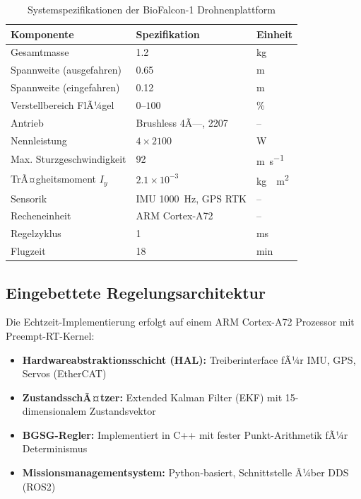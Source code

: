﻿\documentclass[12pt,a4paper]{article}
\theoremstyle{remark}
\begin{document}
	\begin{table}[H]
		\centering
		\caption{Systemspezifikationen der BioFalcon-1 Drohnenplattform}
		\label{tab:hardware}
		\begin{tabular}{lll}
			\toprule
			\textbf{Komponente} & \textbf{Spezifikation} & \textbf{Einheit} \\
			\midrule
			Gesamtmasse & 1.2 & \si{\kg} \\
			Spannweite (ausgefahren) & 0.65 & \si{\m} \\
			Spannweite (eingefahren) & 0.12 & \si{\m} \\
			Verstellbereich FlÃ¼gel & $0$--$100$ & \si{\percent} \\
			Antrieb & Brushless 4Ã—, 2207 & -- \\
			Nennleistung & $4 \times 2100$ & \si{\W} \\
			Max. Sturzgeschwindigkeit & 92 & \si{\m\per\second} \\
			TrÃ¤gheitsmoment $I_y$ & $2.1 \times 10^{-3}$ & \si{\kg\cdot\m^2} \\
			Sensorik & IMU 1000~Hz, GPS RTK & -- \\
			Recheneinheit & ARM Cortex-A72 & -- \\
			Regelzyklus & 1 & \si{\ms} \\
			Flugzeit & 18 & \si{\minute} \\
			\bottomrule
		\end{tabular}
	\end{table}
	
	\subsection{Eingebettete Regelungsarchitektur}
	
	Die Echtzeit-Implementierung erfolgt auf einem ARM Cortex-A72 Prozessor mit Preempt-RT-Kernel:
	
	\begin{itemize}
		\item \textbf{Hardwareabstraktionsschicht (HAL):} Treiberinterface fÃ¼r IMU, GPS, Servos (EtherCAT)
		\item \textbf{ZustandsschÃ¤tzer:} Extended Kalman Filter (EKF) mit 15-dimensionalem Zustandsvektor
		\item \textbf{BGSG-Regler:} Implementiert in C++ mit fester Punkt-Arithmetik fÃ¼r Determinismus
		\item \textbf{Missionsmanagementsystem:} Python-basiert, Schnittstelle Ã¼ber DDS (ROS2)
	\end{itemize}
	
\end{document}
